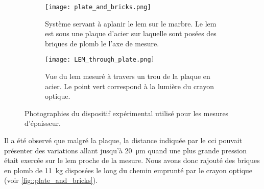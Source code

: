                     
                    
                    
                    \begin{figure}[htpb]
                        \begin{subfigure}[t]{0.5\textwidth}
                            \texttt{[image: plate\_and\_bricks.png]}
                            \caption[Système servant à aplanir le \gls{lem} sur le marbre.]{Système servant à aplanir le \gls{lem} sur le marbre. Le \gls{lem} est sous une plaque d'acier sur laquelle sont posées des briques de plomb le l'axe de mesure.}
                            \label{fig::plate_and_bricks}
                        \end{subfigure}
                        \hfill
                        \begin{subfigure}[t]{0.395\textwidth}
                            \texttt{[image: LEM\_through\_plate.png]}
                            \caption[Vue du \gls{lem} mesuré à travers un trou de la plaque en acier.]{Vue du \gls{lem} mesuré à travers un trou de la plaque en acier. Le point vert correspond à la lumière du crayon optique.}
                            \label{fig::LEM_through_plate}
                        \end{subfigure}
                        \caption{Photographies du dispositif expérimental utilisé pour les mesures d'épaisseur.}
                        \label{fig::dispositif_experimental}
                    \end{figure}
                    Il a été observé que malgré la plaque, la distance indiquée par le \gls{cci} pouvait présenter des variations allant jusqu'à \SI{20}{\micro\meter} quand une plus grande pression était exercée sur le \gls{lem} proche de la mesure. Nous avons donc rajouté des briques en plomb de \SI{11}{\kilo\gram} disposées le long du chemin emprunté par le crayon optique (voir \autoref{fig::plate_and_bricks}). %
                    
